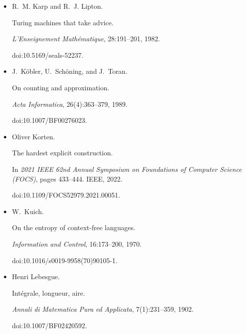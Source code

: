 \documentclass[10pt,a4paper]{article}
\begin{document}
\begin{itemize}
doi:10.1145/335305.335314.





\item[] 
[40]

R. M. Karp and R. J. Lipton.


Turing machines that take advice.


\emph{L’Enseignement Mathématique}, 28:191–201, 1982.


doi:10.5169/seals-52237.





\item[] 
[41]

J. Köbler, U. Schöning, and J. Toran.


On counting and approximation.


\emph{Acta Informatica}, 26(4):363–379, 1989.


doi:10.1007/BF00276023.





\item[] 
[42]

Oliver Korten.


The hardest explicit construction.


In \emph{2021 IEEE 62nd Annual Symposium on Foundations of Computer
Science (FOCS)}, pages 433–444. IEEE, 2022.


doi:10.1109/FOCS52979.2021.00051.





\item[] 
[43]

W. Kuich.


On the entropy of context-free languages.


\emph{Information and Control}, 16:173–200, 1970.


doi:10.1016/s0019-9958(70)90105-1.





\item[] 
[44]

Henri Lebesgue.


Intégrale, longueur, aire.


\emph{Annali di Matematica Pura ed Applicata}, 7(1):231–359, 1902.


doi:10.1007/BF02420592.






\end{itemize}
\end{document}

